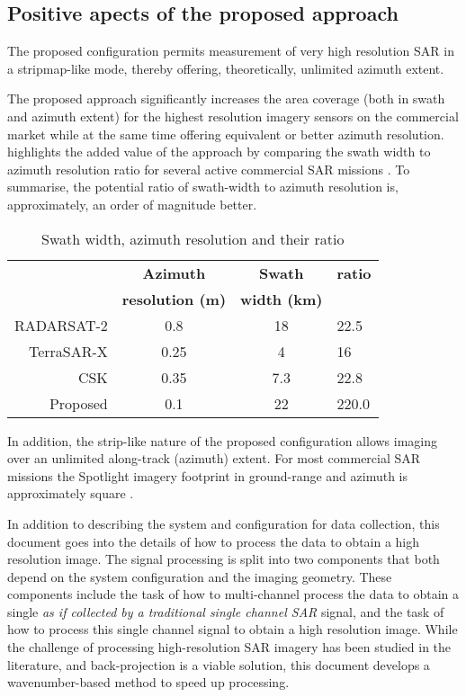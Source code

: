 \subsection{Positive apects of the proposed approach}
The proposed configuration permits measurement of very high resolution SAR in a stripmap-like mode, thereby offering, theoretically, unlimited azimuth extent.
\par
The proposed approach significantly increases the area coverage (both in swath and azimuth extent) for the highest resolution imagery sensors on the commercial market while at the same time offering equivalent or better azimuth resolution.  highlights the added value of the approach by comparing the swath width to azimuth resolution ratio for several active commercial SAR missions \cite{Brautigam2010, Fox2004, Porfilio2016, Mittermayer}. To summarise, the potential ratio of swath-width to azimuth resolution is, approximately, an order of magnitude better. 
\begin{table}[h!]
 \begin{center}
 \caption{Swath width, azimuth resolution and their ratio}
  \begin{tabular}{r|c|c|l}
   & {\bf Azimuth} & {\bf Swath} & {\bf ratio}\\
   & {\bf resolution (m)} & {\bf width (km)} & {}\\\hline
   RADARSAT-2 & 0.8 & 18 & 22.5\\\hline
   TerraSAR-X & 0.25 & 4 & 16\\\hline
   CSK & 0.35 & 7.3 & 22.8\\\hline
   Proposed & 0.1 & 22 & 220.0
  \end{tabular}
  \label{tb:reswidth}
 \end{center}
\end{table}
In addition, the strip-like nature of the proposed configuration allows imaging over an unlimited along-track (azimuth) extent. For most commercial SAR missions the Spotlight imagery footprint in ground-range and azimuth is approximately square \cite{Mittermayer}. 
\par
In addition to describing the system and configuration for data collection, this document goes into the details of how to process the data to obtain a high resolution image. The signal processing is split into two components that both depend on the system configuration and the imaging geometry. These components include the task of how to multi-channel process the data to obtain a single {\em as if collected by a traditional single channel SAR} signal, and the task of how to process this single channel signal to obtain a high resolution image. While the challenge of processing high-resolution SAR imagery has been studied in the literature, and back-projection is a viable solution, this document develops a wavenumber-based method to speed up processing.
